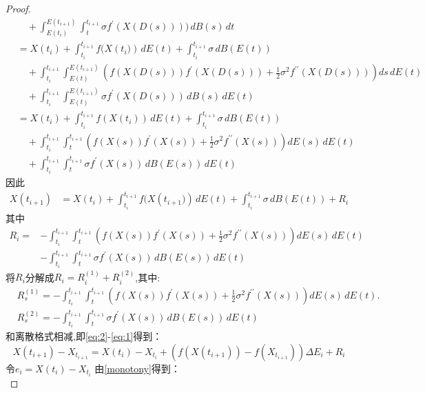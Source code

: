 \begin{proof}
\begin{align*}
		&\quad + \int_{E(t_i)}^{E(t_{i+1})} \int_{t}^{t_{i+1}}\sigma f^{\prime}(X(D(s)))) \, dB(s) \, dt \\
		&= X(t_i) + \int_{t_i}^{t_{i+1}} f(X({t_i)}) \, dE(t) + \int_{t_i}^{t_{i+1}} \sigma \, dB(E(t)) \\
		&\quad + \int_{t_i}^{t_{i+1}} \int_{E(t)}^{E(t_{i+1})} \left( f(X(D(s))) f^{\prime}(X(D(s))) + \frac{1}{2} \sigma^2 f^{\prime\prime}(X(D(s))) \right) ds \, dE(t) \\
		&\quad + \int_{t_i}^{t_{i+1}} \int_{E(t)}^{E(t_{i+1})}\sigma f^{\prime}(X(D(s))) \, dB(s) \, dE(t)\\
		&= X(t_i) + \int_{t_i}^{t_{i+1}} f(X({t_i})) \, dE(t) + \int_{t_i}^{t_{i+1}} \sigma \, dB(E(t)) \\
		&\quad + \int_{t_i}^{t_{i+1}} \int_{t}^{t_{i+1}} \left( f(X(s)) f^{\prime}(X(s)) + \frac{1}{2} \sigma^2 f^{\prime\prime}(X(s)) \right) dE(s) \, dE(t) \\
		&\quad + \int_{t_i}^{t_{i+1}} \int_{t}^{t_{i+1}}\sigma f^{\prime}(X(s)) \, dB(E(s)) \, dE(t)
	\end{align*}
	因此
	\begin{align}\label{eq:2}
		X(t_{i+1})
		&= X(t_i) + \int_{t_i}^{t_{i+1}} f(X({t_{i+1})}) \, dE(t) + \int_{t_i}^{t_{i+1}} \sigma \, dB(E(t)) + R_i
	\end{align}
	其中
	\begin{align*}
		R_i = &-\int_{t_i}^{t_{i+1}} \int_{t}^{t_{i+1}} \left( f(X(s)) f^{\prime}(X(s)) + \frac{1}{2} \sigma^2 f^{\prime\prime}(X(s)) \right) dE(s) \, dE(t)\\
		&-\int_{t_i}^{t_{i+1}} \int_{t}^{t_{i+1}} \sigma f^{\prime}(X(s)) \, dB(E(s)) \, dE(t)
	\end{align*}
	将$R_i$分解成$R_i = R_i^{(1)} + R_i^{(2)}$,其中:
	\begin{align*}
		& R_s^{(1)} = -\int_{t_i}^{t_{i+1}} \int_{t}^{t_{i+1}} \left( f(X(s)) f^{\prime}(X(s)) + \frac{1}{2} \sigma^2 f^{\prime\prime}(X(s)) \right) dE(s) \, dE(t).\\
		& R_s^{(2)} = -\int_{t_i}^{t_{i+1}} \int_{t}^{t_{i+1}} \sigma f^{\prime}(X(s)) \, dB(E(s)) \, dE(t)  
	\end{align*}
	和离散格式相减,即\cref{eq:2}-\cref{eq:1}得到：
	\begin{equation}
		X({t_{i+1}})-X_{t_{i+1}}=X({t_i})-X_{t_i}+(f{(X({t_{i+1}}))}-f{(X_{t_{i+1}})})\Delta E_{i}+R_{i}
	\end{equation}
	令$e_i = X({t_i})-X_{t_i}$
	由\cref{monotony}得到：
	\begin{equation}

\end{equation}
\end{proof}
